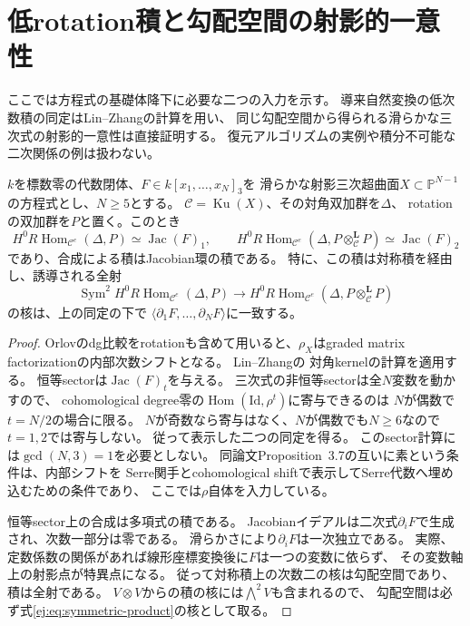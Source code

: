 \section{低rotation積と勾配空間の射影的一意性}
\label{sec:explicit-jacobian-recovery}

ここでは方程式の基礎体降下に必要な二つの入力を示す。
導来自然変換の低次数積の同定はLin--Zhangの計算を用い、
同じ勾配空間から得られる滑らかな三次式の射影的一意性は直接証明する。
復元アルゴリズムの実例や積分不可能な二次関係の例は扱わない。

\begin{proposition}[可換三次超曲面における低次数積]
\label{prop:ej-geometric-low-degree}
$k$を標数零の代数閉体、$F\in k[x_1,\ldots,x_N]_3$を
滑らかな射影三次超曲面$X\subset\mathbb P^{N-1}$の方程式とし、$N\ge5$とする。
$\mathcal C=\operatorname{Ku}(X)$、その対角双加群を$\Delta$、
rotationの双加群を$P$と置く。このとき
\[
 H^0R\operatorname{Hom}_{\mathcal C^e}(\Delta,P)
 \simeq\operatorname{Jac}(F)_1,
 \qquad
 H^0R\operatorname{Hom}_{\mathcal C^e}
 (\Delta,P\otimes_{\mathcal C}^{\mathbf L}P)
 \simeq\operatorname{Jac}(F)_2
\]
であり、合成による積はJacobian環の積である。
特に、この積は対称積を経由し、誘導される全射
\begin{equation}\label{ej:eq:symmetric-product}
 \operatorname{Sym}^2
 H^0R\operatorname{Hom}_{\mathcal C^e}(\Delta,P)
 \longrightarrow
 H^0R\operatorname{Hom}_{\mathcal C^e}
 (\Delta,P\otimes_{\mathcal C}^{\mathbf L}P)
\end{equation}
の核は、上の同定の下で
$\langle\partial_1F,\ldots,\partial_NF\rangle$に一致する。
\end{proposition}
\begin{proof}
Orlovのdg比較をrotationも含めて用いると、$\rho_X$はgraded matrix
factorizationの内部次数シフトとなる。
Lin--Zhang\cite[Theorems~2.2, 3.5, Remark~3.6, Section~5]{LZ}の
対角kernelの計算を適用する。
恒等sectorは$\operatorname{Jac}(F)_t$を与える。
三次式の非恒等sectorは全$N$変数を動かすので、
cohomological degree零の$\operatorname{Hom}(\mathrm{Id},\rho^t)$に寄与できるのは
$N$が偶数で$t=N/2$の場合に限る。
$N$が奇数なら寄与はなく、$N$が偶数でも$N\ge6$なので$t=1,2$では寄与しない。
従って表示した二つの同定を得る。
このsector計算には$\gcd(N,3)=1$を必要としない。
同論文Proposition~3.7の互いに素という条件は、内部シフトを
Serre関手とcohomological shiftで表示してSerre代数へ埋め込むための条件であり、
ここでは$\rho$自体を入力している。

恒等sector上の合成は多項式の積である\cite[Remark~3.6]{LZ}。
Jacobianイデアルは二次式$\partial_iF$で生成され、次数一部分は零である。
滑らかさにより$\partial_iF$は一次独立である。
実際、定数係数の関係があれば線形座標変換後に$F$は一つの変数に依らず、
その変数軸上の射影点が特異点になる。
従って対称積上の次数二の核は勾配空間であり、積は全射である。
$V\otimes V$からの積の核には$\bigwedge^2V$も含まれるので、
勾配空間は必ず式\eqref{ej:eq:symmetric-product}の核として取る。
\end{proof}

